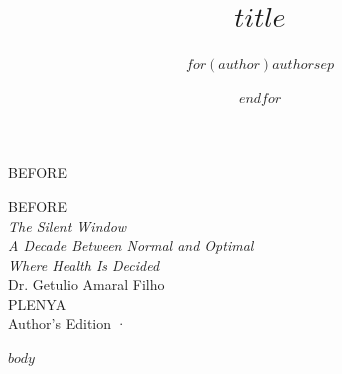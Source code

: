 \documentclass[11pt,openright,twoside]{book}
\title{$title$}
\author{$for(author)$$author$$sep$ \and $endfor$}
\begin{document}
\frontmatter
\pagestyle{empty}

\thispagestyle{empty}
\vspace*{4cm}
\begin{center}
{\sffamily\fontsize{36}{42}\selectfont\color{petrol} BEFORE}
\end{center}
\clearpage

\thispagestyle{empty}\null\clearpage

\thispagestyle{empty}
\vspace*{3cm}
\begin{center}
{\sffamily\fontsize{52}{58}\selectfont\color{petrol} BEFORE}\\[2.2em]
{\itshape\fontsize{16}{22}\selectfont The Silent Window\\[0.1em]
A Decade Between Normal and Optimal\\[0.3em]
Where Health Is Decided}\\[5em]
{\sffamily\fontsize{14}{18}\selectfont\color{ink} Dr. Getulio Amaral Filho}\\[6em]
\vfill
{\sffamily\footnotesize\color{gold} PLENYA}\\[0.4em]
{\sffamily\footnotesize\color{ink} Author's Edition \quad·}
\end{center}
\clearpage

$body$
\end{document}
